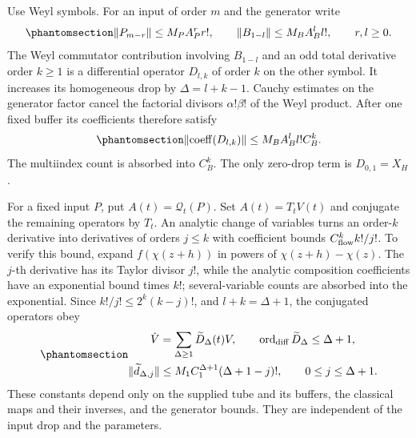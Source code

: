 \documentclass[
  english,
  11pt,
  reqno]{amsart}
\begin{document}
Use Weyl symbols. For an input of order \(m\) and the generator write
\begin{equation}\protect\phantomsection\label{eq:gg-op-flow-input-bounds}{
 \|P_{m-r}\|\le M_PA_P^r r!,\qquad
 \|B_{1-l}\|\le M_BA_B^l l!,\qquad r,l\ge0.
}\end{equation} The Weyl commutator contribution involving \(B_{1-l}\)
and an odd total derivative order \(k\ge1\) is a differential operator
\(D_{l,k}\) of order \(k\) on the other symbol. It increases its
homogeneous drop by \(\Delta=l+k-1\). Cauchy estimates on the generator
factor cancel the factorial divisors \(\alpha!\beta!\) of the Weyl
product. After one fixed buffer its coefficients therefore satisfy
\begin{equation}\protect\phantomsection\label{eq:gg-op-flow-differential-bound}{
 \|{\rm coeff}(D_{l,k})\|
       \le M_BA_B^l l!C_B^k .
}\end{equation} The multiindex count is absorbed into \(C_B^k\). The
only zero-drop term is \(D_{0,1}=X_H\).

For a fixed input \(P\), put \(A(t)=\mathcal Q_t(P)\). Set
\(A(t)=T_tV(t)\) and conjugate the remaining operators by \(T_t\). An
analytic change of variables turns an order-\(k\) derivative into
derivatives of orders \(j\le k\) with coefficient bounds
\(C_{\rm flow}^k k!/j!\). To verify this bound, expand \(f(\chi(z+h))\)
in powers of \(\chi(z+h)-\chi(z)\). The \(j\)-th derivative has its
Taylor divisor \(j!\), while the analytic composition coefficients have
an exponential bound times \(k!\); several-variable counts are absorbed
into the exponential. Since \(k!/j!\le2^k(k-j)!\), and \(l+k=\Delta+1\),
the conjugated operators obey
\begin{equation}\protect\phantomsection\label{eq:gg-op-flow-interaction-bound}{
 \begin{gathered}
 \dot V=\sum_{\Delta\ge1}\widetilde D_\Delta(t)V,\qquad
 \operatorname{ord}_{\rm diff}\widetilde D_\Delta\le\Delta+1,\\
 \|\widetilde d_{\Delta,j}\|
   \le M_1C_1^{\Delta+1}(\Delta+1-j)!,
       \qquad 0\le j\le\Delta+1 .
 \end{gathered}
}\end{equation} These constants depend only on the supplied tube and its
buffers, the classical maps and their inverses, and the generator
bounds. They are independent of the input drop and the parameters.
\end{document}

